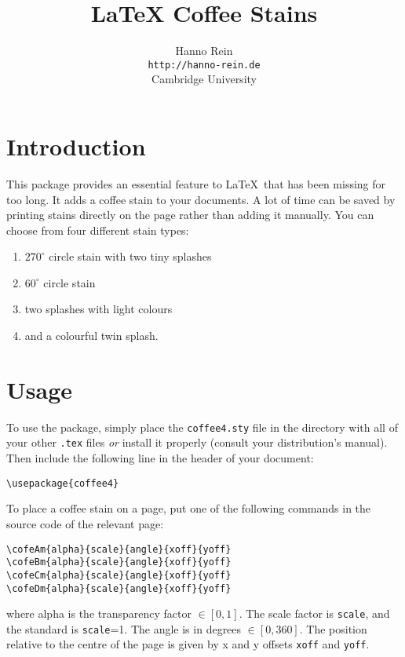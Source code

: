 \documentclass{article}
\begin{document}
\title{LaTeX Coffee Stains}
\author{Hanno Rein\\
\texttt{http://hanno-rein.de}\\
Cambridge University}
\renewcommand{\today}{April 3, 2009}
\maketitle

 
\section{Introduction}
This package provides an essential feature to \LaTeX~that has been missing for too long. It adds a coffee stain to your documents. A lot of time can be saved by printing stains directly on the page rather than adding it manually. You can choose from four different stain types:
\begin{enumerate}
  \item $270^\circ$ circle stain with two tiny splashes 
  \item $60^\circ$ circle stain 
  \item two splashes with light colours
  \item and a colourful twin splash.
\end{enumerate}

\section{Usage}
To use the package, simply place the \texttt{coffee4.sty} file in the directory with all of your
other \texttt{.tex} files \textit{or} install it properly (consult your distribution's manual). 
Then include the following line in the header of your document:
\begin{verbatim}
\usepackage{coffee4}
\end{verbatim}
To place a coffee stain on a page, put one of the following commands in the source code of the relevant page: 
\begin{verbatim}
\cofeAm{alpha}{scale}{angle}{xoff}{yoff}
\cofeBm{alpha}{scale}{angle}{xoff}{yoff}
\cofeCm{alpha}{scale}{angle}{xoff}{yoff}
\cofeDm{alpha}{scale}{angle}{xoff}{yoff}
\end{verbatim}
where alpha is the transparency factor $\in [0,1]$. The scale factor is {\tt scale}, and the standard is {\tt scale}=1. 
The angle is in degrees $\in [0,360]$. 
The position relative to the centre of the page is given by x and y offsets \texttt{xoff} and \texttt{yoff}.
\end{document}
